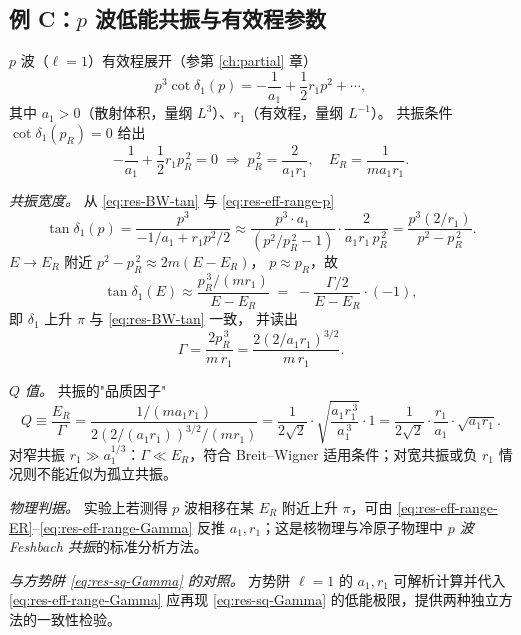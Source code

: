\subsection{例 C：$p$ 波低能共振与有效程参数}\label{subsec:res-ex-effrange}

\begin{example}\label{ex:res-effrange-pwave}
  $p$ 波（$\ell=1$）有效程展开（参第 \ref{ch:partial} 章）
  \begin{equation}\label{eq:res-eff-range-p}
    p^3\cot\delta_1(p)=-\frac{1}{a_1}+\frac{1}{2}r_1 p^2+\cdots ,
  \end{equation}
  其中 $a_1>0$（散射体积，量纲 $L^3$）、$r_1$（有效程，量纲 $L^{-1}$）。
  共振条件 $\cot\delta_1(p_R)=0$ 给出
  \begin{equation}\label{eq:res-eff-range-ER}
    -\frac{1}{a_1}+\frac{1}{2}r_1 p_R^{\,2}=0
    \;\Longrightarrow\;
    p_R^{\,2}=\frac{2}{a_1 r_1},\quad
    E_R=\frac{1}{m a_1 r_1}.
  \end{equation}

  \emph{共振宽度。}
  从 \eqref{eq:res-BW-tan} 与 \eqref{eq:res-eff-range-p}
  \begin{equation}
    \tan\delta_1(p)=\frac{p^3}{-1/a_1+r_1 p^2/2}
    \approx \frac{p^3 \cdot a_1}{(p^2/p_R^{\,2}-1)}
    \cdot\frac{2}{a_1 r_1\,p_R^{\,2}}
    =\frac{p^3 (2/r_1)}{p^2-p_R^{\,2}}.
  \end{equation}
  $E\to E_R$ 附近 $p^2-p_R^{\,2}\approx 2m(E-E_R)$，
  $p\approx p_R$，故
  \begin{equation*}
    \tan\delta_1(E)\approx \frac{p_R^{\,3}/(m r_1)}{E-E_R}
    \;=\;-\frac{\Gamma/2}{E-E_R}\cdot(-1),
  \end{equation*}
  即 $\delta_1$ 上升 $\pi$ 与 \eqref{eq:res-BW-tan} 一致，
  并读出
  \begin{equation}\label{eq:res-eff-range-Gamma}
    \boxed{\;\Gamma=\frac{2 p_R^{\,3}}{m\,r_1}=\frac{2(2/a_1 r_1)^{3/2}}{m\,r_1}.\;}
  \end{equation}

  \emph{$Q$ 值。}
  共振的"品质因子"
  \begin{equation}
    Q\equiv \frac{E_R}{\Gamma}=\frac{1/(m a_1 r_1)}{2(2/(a_1 r_1))^{3/2}/(m r_1)}
    =\frac{1}{2\sqrt{2}}\cdot\sqrt{\frac{a_1 r_1^{\,3}}{a_1^{\,3}}}\cdot 1
    =\frac{1}{2\sqrt{2}}\cdot\frac{r_1}{a_1}\cdot \sqrt{a_1 r_1}.
  \end{equation}
  对窄共振 $r_1\gg a_1^{1/3}$：$\Gamma\ll E_R$，符合 Breit--Wigner
  适用条件；对宽共振或负 $r_1$ 情况则不能近似为孤立共振。

  \emph{物理判据。}
  实验上若测得 $p$ 波相移在某 $E_R$ 附近上升 $\pi$，可由
  \eqref{eq:res-eff-range-ER}--\eqref{eq:res-eff-range-Gamma}
  反推 $a_1, r_1$；这是核物理与冷原子物理中
  \emph{$p$ 波 Feshbach 共振}的标准分析方法。

  \emph{与方势阱 \eqref{eq:res-sq-Gamma} 的对照。}
  方势阱 $\ell=1$ 的 $a_1, r_1$ 可解析计算并代入
  \eqref{eq:res-eff-range-Gamma} 应再现 \eqref{eq:res-sq-Gamma}
  的低能极限，提供两种独立方法的一致性检验。
\end{example}

